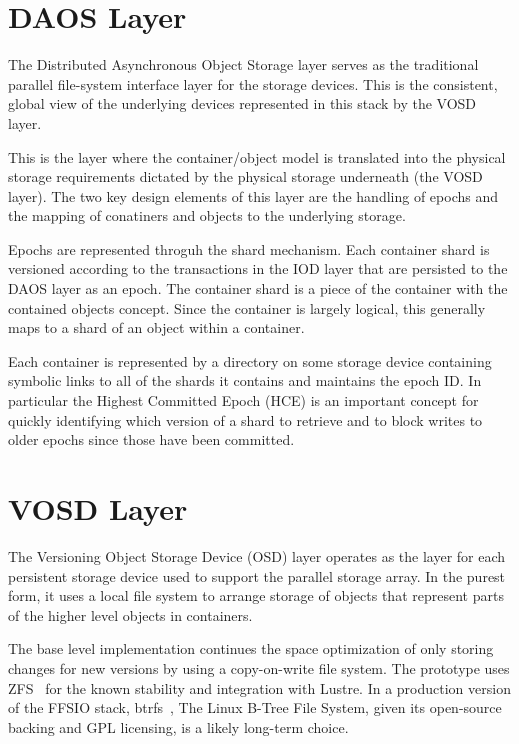 \documentclass[conference]{IEEEtran}
\begin{document}
\section{DAOS Layer}
\label{sec:daos}

The Distributed Asynchronous Object Storage layer serves as the traditional
parallel file-system interface layer for the storage devices. This is the
consistent, global view of the underlying devices represented in this stack
by the VOSD layer.

This is the layer where the container/object model is translated into the
physical storage requirements dictated by the physical storage underneath (the
VOSD layer). The two key design elements of this layer are the handling of
epochs and the mapping of conatiners and objects to the underlying storage.

Epochs are represented throguh the shard mechanism. Each container shard is
versioned according to the transactions in the IOD layer that are persisted to
the DAOS layer as an epoch. The container shard is a piece of the container
with the contained objects concept. Since the container is largely logical,
this generally maps to a shard of an object within a container.

Each container is represented by a directory on some storage device containing
symbolic links to all of the shards it contains and maintains the epoch ID.
In particular the Highest Committed Epoch (HCE) is an important concept for
quickly identifying which version of a shard to retrieve and to block writes to
older epochs since those have been committed.

\section{VOSD Layer}\label{sec:vosd}
The Versioning Object Storage Device (OSD) layer operates as the layer for each
persistent storage device used to support the parallel storage array. In the
purest form, it uses a local file system to arrange storage of objects that
represent parts of the higher level objects in containers.

The base level implementation continues the space optimization of only storing
changes for new versions by using a copy-on-write file system. The prototype
uses ZFS~\cite{zhang:2010:zfs} for the known stability and integration with
Lustre. In a production version of the FFSIO stack,
btrfs~\cite{rodeh:2013:btrfs}, The Linux B-Tree File System, given its
open-source backing and GPL licensing, is a likely long-term choice.
\end{document}
